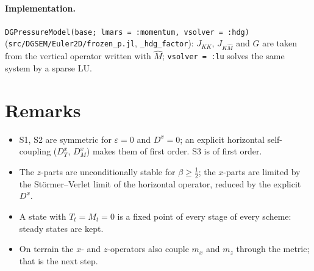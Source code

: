 \documentclass[11pt,a4paper]{article}
\newcommand{\code}[1]{\texttt{#1}}
\begin{document}
\paragraph{Implementation.} \code{DGPressureModel(base; lmars = :momentum, vsolver = :hdg)} (\code{src/DGSEM/Euler2D/frozen\_p.jl},
\code{\_hdg\_factor}): $J_{KK}$, $J_{K\hat M}$ and $G$ are taken from the vertical operator written with $\hat M$; \code{vsolver = :lu} solves the same
system by a sparse LU.

\section{Remarks}
\begin{itemize}
\item S1, S2 are symmetric for $\varepsilon=0$ and $D^x=0$; an explicit horizontal self-coupling ($D_T^x$, $D_M^x$) makes them of first order.
  S3 is of first order.
\item The $z$-parts are unconditionally stable for $\beta\ge\tfrac12$; the $x$-parts are limited by the Störmer--Verlet limit of the horizontal operator,
  reduced by the explicit $D^x$.
\item A state with $T_t=M_t=0$ is a fixed point of every stage of every scheme: steady states are kept.
\item On terrain the $x$- and $z$-operators also couple $m_x$ and $m_z$ through the metric; that is the next step.
\end{itemize}
\end{document}
